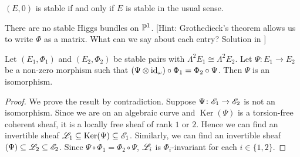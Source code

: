 \documentclass[A4paper, 12pt, british, reqno]{amsart}
\DeclareMathOperator{\id}{id}
\let\Im\relax
\DeclareMathOperator{\Im}{Im}
\DeclareMathOperator{\Ker}{Ker}
\newcommand{\ot}{\otimes}
\newcommand{\op}{\oplus}
\begin{document}
\begin{rem}
    $(E,0)$ is stable if and only if $E$ is stable in the usual sense.
\end{rem}

\begin{exe}
    There are no stable Higgs bundles on $\P^{1}$.
    [Hint: Grothedieck's theorem allows us to write $\Phi$ as a matrix.
    What can we say about each entry?
    Solution in \cite{hit87a}]
\end{exe}


\begin{prop}
    Let $(E_{1},\Phi_{1})$ and $(E_{2},\Phi_{2})$ be stable pairs with $\Lambda^{2}E_{1}\cong \Lambda^{2}E_{2}$.
    Let $\Psi\colon E_{1}\to E_{2}$ be a non-zero morphism such that $(\Psi\ot \id_{\w}) \circ \Phi_{1}=\Phi_{2}\circ \Psi$.
    Then $\Psi$ is an isomorphism.
    \begin{proof}
	We prove the result by contradiction.
	Suppose $\Psi\colon \E_{1}\to \E_{2}$ is not an isomorphism.
	Since we are on an algebraic curve and $\Ker(\Psi)$ is a torsion-free coherent sheaf, it is a locally free sheaf of rank $1$ or $2$.
	Hence we can find an invertible sheaf $\L_{1}\subseteq \Ker(\Psi)\subseteq \E_{1}$.
	Similarly, we can find an invertible sheaf $\Im(\Psi)\subseteq \L_{2}\subseteq \E_{2}$.
	Since $\Psi\circ \Phi_{1}=\Phi_{2}\circ \Psi$, $\L_{i}$ is $\Phi_{i}$-invariant for each $i\in \{1,2\}$.
    \end{proof}
\end{prop}
\end{document}

